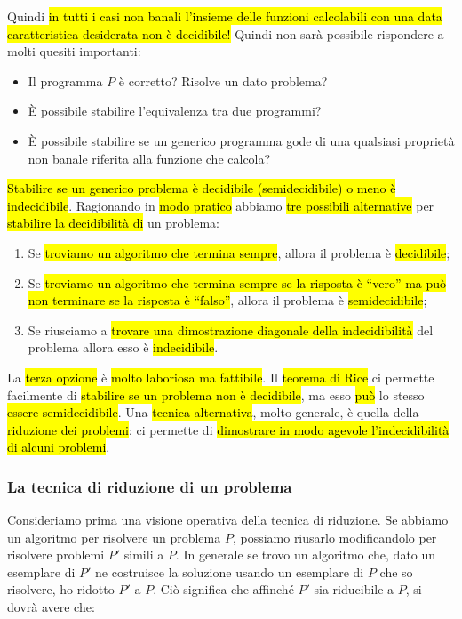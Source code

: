 \documentclass[a4paper,11pt,oneside]{article}
\theoremstyle{plain}
\theoremstyle{definition}
\theoremstyle{remark}
\begin{document}
Quindi \hl{in tutti i casi non banali l'insieme delle funzioni calcolabili con
una data caratteristica desiderata non è decidibile!} Quindi non sarà possibile
rispondere a molti quesiti importanti:

\begin{itemize}
  \item Il programma $P$ è corretto? Risolve un dato problema?
  \item È possibile stabilire l'equivalenza tra due programmi?
  \item È possibile stabilire se un generico programma gode di una qualsiasi
    proprietà non banale riferita alla funzione che calcola?
\end{itemize}

\hl{Stabilire se un generico problema è decidibile (semidecidibile) o meno è
indecidibile}. Ragionando in \hl{modo pratico} abbiamo \hl{tre possibili
alternative} per \hl{stabilire la decidibilità di} un problema:

\begin{enumerate}
  \item Se \hl{troviamo un algoritmo che termina sempre}, allora il problema è
    \hl{decidibile};
  \item Se \hl{troviamo un algoritmo che termina sempre se la risposta è
    ``vero'' ma può non terminare se la risposta è ``falso''}, allora il
    problema è \hl{semidecidibile};
  \item Se riusciamo a \hl{trovare una dimostrazione diagonale della
    indecidibilità} del problema allora esso è \hl{indecidibile}.
\end{enumerate}

La \hl{terza opzione} è \hl{molto laboriosa ma fattibile}. Il \hl{teorema di
Rice} ci permette facilmente di \hl{stabilire se un problema non è decidibile},
ma esso \hl{può} lo stesso \hl{essere semidecidibile}. Una \hl{tecnica
alternativa}, molto generale, è quella della \hl{riduzione dei problemi}: ci
permette di \hl{dimostrare in modo agevole l'indecidibilità di alcuni problemi}.

\subsubsection{La tecnica di riduzione di un problema}\label{sec:riduzione}

Consideriamo prima una visione operativa della tecnica di riduzione. Se abbiamo
un algoritmo per risolvere un problema $P$, possiamo riusarlo modificandolo per
risolvere problemi $P'$ simili a $P$. In generale se trovo un algoritmo che,
dato un esemplare di $P'$ ne costruisce la soluzione usando un esemplare di $P$
che so risolvere, ho ridotto $P'$ a $P$. Ciò significa che affinché $P'$ sia
riducibile a $P$, si dovrà avere che:
\end{document}
